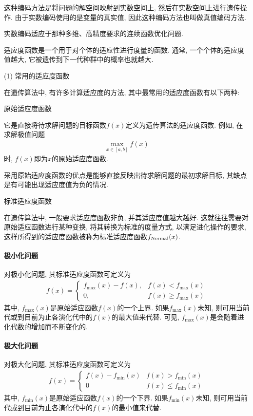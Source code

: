 {这种编码方法是将问题的解空间映射到实数空间上, 然后在实数空间上进行遗传操作. 由于实数编码使用的是变量的真实值, 因此这种编码方法也叫做真值编码方法.

实数编码适应于那种多维、高精度要求的连续函数优化问题.

适应度函数是一个用于对个体的适应性进行度量的函数. 通常, 一个个体的适应度值越大, 它被遗传到下一代种群中的概率也就越大.

(1) 常用的适应度函数


 在遗传算法中, 有许多计算适应度的方法, 其中最常用的适应度函数有以下两种:

 原始适应度函数

 它是直接将待求解问题的目标函数$f(x)$定义为遗传算法的适应度函数. 例如, 在求解极值问题
\begin{align}
 \max _{x \in[a, b]} f(x)
\end{align}
时, $f(x)$即为$x$的原始适应度函数.

采用原始适应度函数的优点是能够直接反映出待求解问题的最初求解目标, 其缺点是有可能出现适应度值为负的情况.

 标准适应度函数

在遗传算法中, 一般要求适应度函数非负, 并其适应度值越大越好. 这就往往需要对原始适应函数进行某种变换, 将其转换为标准的度量方式, 以满足进化操作的要求, 这样所得到的适应度函数被称为标准适应度函数$f_{\textup{Normal}}(x)$.
\paragraph{极小化问题}
对极小化问题, 其标准适应度函数可定义为
\begin{align}
f(x)=
\left\{\begin{array}{ll}
{f_{\max }(x)-f(x)}, &f(x)<f_{\max}(x) \\
{0}, & f(x)\geq f_{\max }(x)
\end{array}
\right.
\end{align}
其中, $f_{\max}(x)$是原始适应函数$f(x)$的一个上界. 如果$f_{\max}(x)$未知, 则可用当前代或到目前为止各演化代中的$f(x)$的最大值来代替. 可见,  $f_{\max}(x)$是会随着进化代数的增加而不断变化的.
\paragraph{极大化问题}
对极大化问题, 其标准适应度函数可定义为
\begin{align}
  f(x)=\left\{
  \begin{array}{ll}
  f(x)-f_{\min }(x) &f(x)>f_{\min}(x)\\
 0 & f(x)\leq f_{\min}(x)
  \end{array}
  \right.
\end{align}
其中, $f_{\min}(x)$是原始适应函数$f(x)$的一个下界. 如果$f_{\min}(x)$未知, 则可用当前代或到目前为止各演化代中的$f(x)$的最小值来代替.

}
